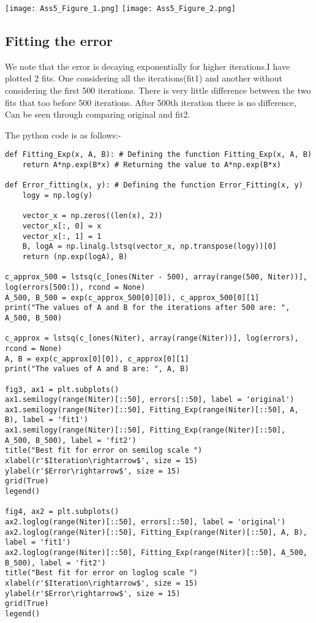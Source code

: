 \documentclass[11pt, a4paper]{article}
\begin{document}
    
     \texttt{[image: Ass5\_Figure\_1.png]} 
     \texttt{[image: Ass5\_Figure\_2.png]}  



\subsection{Fitting the error}
We note that the error is decaying exponentially for higher iterations.I have plotted 2 fits. One considering all the iterations(fit1) and another without considering the first 500 iterations. There is very little difference between the two fits that too before 500 iterations. After 500th iteration there is no difference, Can be seen through comparing original and fit2.

The python code is as follows:-
\begin{verbatim}
def Fitting_Exp(x, A, B): # Defining the function Fitting_Exp(x, A, B)
    return A*np.exp(B*x) # Returning the value to A*np.exp(B*x) 
    
def Error_fitting(x, y): # Defining the function Error_Fitting(x, y) 
    logy = np.log(y)

    vector_x = np.zeros((len(x), 2))
    vector_x[:, 0] = x
    vector_x[:, 1] = 1
    B, logA = np.linalg.lstsq(vector_x, np.transpose(logy))[0]
    return (np.exp(logA), B)
    
c_approx_500 = lstsq(c_[ones(Niter - 500), array(range(500, Niter))], 
log(errors[500:]), rcond = None) 
A_500, B_500 = exp(c_approx_500[0][0]), c_approx_500[0][1]
print("The values of A and B for the iterations after 500 are: ", A_500, B_500)

c_approx = lstsq(c_[ones(Niter), array(range(Niter))], log(errors), rcond = None) 
A, B = exp(c_approx[0][0]), c_approx[0][1]
print("The values of A and B are: ", A, B)
    
fig3, ax1 = plt.subplots()
ax1.semilogy(range(Niter)[::50], errors[::50], label = 'original')
ax1.semilogy(range(Niter)[::50], Fitting_Exp(range(Niter)[::50], A, B), label = 'fit1')
ax1.semilogy(range(Niter)[::50], Fitting_Exp(range(Niter)[::50], A_500, B_500), label = 'fit2')
title("Best fit for error on semilog scale ")
xlabel(r'$Iteration\rightarrow$', size = 15)
ylabel(r'$Error\rightarrow$', size = 15)
grid(True)
legend()

fig4, ax2 = plt.subplots()
ax2.loglog(range(Niter)[::50], errors[::50], label = 'original')
ax2.loglog(range(Niter)[::50], Fitting_Exp(range(Niter)[::50], A, B), label = 'fit1')
ax2.loglog(range(Niter)[::50], Fitting_Exp(range(Niter)[::50], A_500, B_500), label = 'fit2')
title("Best fit for error on loglog scale ")
xlabel(r'$Iteration\rightarrow$', size = 15)
ylabel(r'$Error\rightarrow$', size = 15)
grid(True)
legend()


\end{verbatim} 
\end{document}
